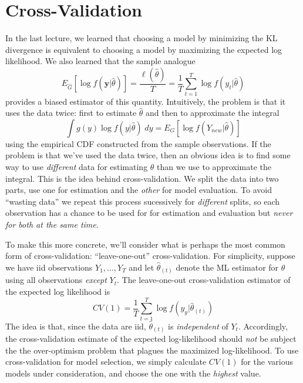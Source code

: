 \documentclass[12pt]{article}
\theoremstyle{definition}
\begin{document}
\section{Cross-Validation}
In the last lecture, we learned that choosing a model by minimizing the KL divergence is equivalent to choosing a model by maximizing the expected log likelihood. We also learned that the sample analogue
 $$E_{\widehat{G}}\left[\log f(\textbf{y}|\widehat{\theta}) \right]= \frac{\ell(\widehat{\theta})}{T}= \frac{1}{T} \sum_{t=1}^T \log f(y_t|\widehat{\theta})$$
provides a biased estimator of this quantity. Intuitively, the problem is that it uses the data twice: first to estimate $\widehat{\theta}$ and then to approximate the integral
	$$\int g(y) \log f(y|\widehat{\theta}) \; dy = E_G\left[\log f(Y_{new}|\widehat{\theta}) \right]$$
using the empirical CDF constructed from the sample observations. If the problem is that we've used the data twice, then an obvious idea is to find some way to use \emph{different} data for estimating $\theta$ than we use to approximate the integral. This is the idea behind cross-validation. We split the data into two parts, use one for estimation and the \emph{other} for model evaluation. To avoid ``wasting data'' we repeat this process sucessively for \emph{different} splits, so each observation has a chance to be used for for estimation and evaluation but \emph{never for both at the same time}.

To make this more concrete, we'll consider what is perhaps the most common form of cross-validation: ``leave-one-out'' cross-validation. For simplicity, suppose we have iid observations $Y_1, \hdots, Y_T$ and let $\widehat{\theta}_{(t)}$ denote the ML estimator for $\theta$ using all observations \emph{except} $Y_t$. The leave-one-out cross-validation estimator of the expected log likelihood is
	$$CV(1) = \frac{1}{T} \sum_{t=1}^T \log f(y_y|\widehat{\theta}_{(t)})$$
The idea is that, since the data are iid, $\widehat{\theta}_{(t)}$ is \emph{independent} of $Y_t$. Accordingly, the cross-validation estimate of the expected log-likelihood should \emph{not} be subject the the over-optimism problem that plagues the maximized log-likelihood. To use cross-validation for model selection, we simply calculate $CV(1)$ for the various models under consideration, and choose the one with the \emph{highest} value.
\end{document}
